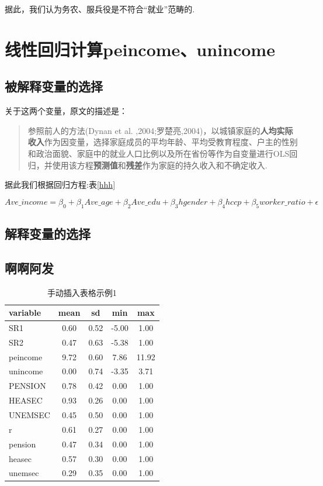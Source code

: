 \documentclass[a4paper,12pt]{report}
\begin{document}
据此，我们认为务农、服兵役是不符合“就业”范畴的.


\section{线性回归计算peincome、unincome}
\subsection{被解释变量的选择}
关于这两个变量，原文的描述是：
\begin{quotation}
  参照前人的方法(Dynan et al. ,2004;罗楚亮,2004)，以城镇家庭的\textbf{人均实际收入}作为因变量，选择家庭成员的平均年龄、平均受教育程度、户主的性别和政治面貌、家庭中的就业人口比例以及所在省份等作为自变量进行OLS回归，并使用该方程\textbf{预测值}和\textbf{残差}作为家庭的持久收入和不确定收入.
\end{quotation}

据此我们根据回归方程:表\ref{hhh}

\[
Ave\_income = \beta_0 + \beta_{1}Ave\_age + \beta_{2}Ave\_edu + \beta_{3}hgender + \beta_{4}hccp + \beta_{5}worker\_ratio + \epsilon
\]


\subsection{解释变量的选择}
\subsection{啊啊阿发}
\begin{table}
    \caption{手动插入表格示例1}
    \centering
    \begin{tabular}{lcccc}
        \toprule[1.5pt]
        variable & mean & sd & min & max \\ 
        \midrule[1.0pt]
        SR1 & 0.60 & 0.52 & -5.00 & 1.00 \\ 
        SR2 & 0.47 & 0.63 & -5.38 & 1.00 \\ 
        peincome & 9.72 & 0.60 & 7.86 & 11.92 \\ 
        unincome & 0.00 & 0.74 & -3.35 & 3.71 \\ 
        PENSION & 0.78 & 0.42 & 0.00 & 1.00 \\ 
        HEASEC & 0.93 & 0.26 & 0.00 & 1.00 \\ 
        UNEMSEC & 0.45 & 0.50 & 0.00 & 1.00 \\ 
        r & 0.61 & 0.27 & 0.00 & 1.00 \\ 
        pension & 0.47 & 0.34 & 0.00 & 1.00 \\ 
        heasec & 0.57 & 0.30 & 0.00 & 1.00 \\ 
        unemsec & 0.29 & 0.35 & 0.00 & 1.00 \\ 
        \bottomrule[1.5pt]
    \end{tabular}
\end{table}
\end{document}
